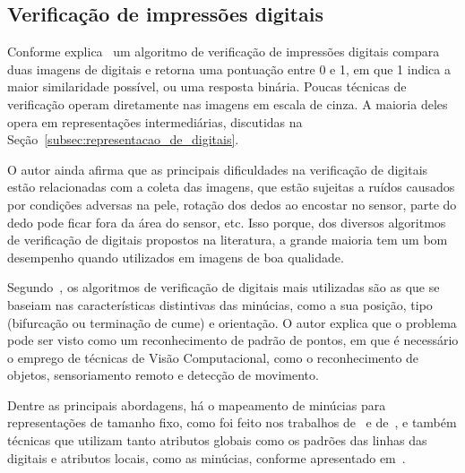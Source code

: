 \subsection{Verificação de impressões digitais}\label{subsubsec:verificacao_digitais}

Conforme explica~ um algoritmo de verificação de impressões digitais compara duas imagens de digitais e retorna uma pontuação entre 0 e 1, em que 1 indica a maior similaridade possível, ou uma resposta binária. Poucas técnicas de verificação operam diretamente nas imagens em escala de cinza. A maioria deles opera em representações intermediárias, discutidas na Seção~\ref{subsec:representacao_de_digitais}.

O autor ainda afirma que as principais dificuldades na verificação de digitais estão relacionadas com a coleta das imagens, que estão sujeitas a ruídos causados por condições adversas na pele, rotação dos dedos ao encostar no sensor, parte do dedo pode ficar fora da área do sensor, etc. Isso porque, dos diversos algoritmos de verificação de digitais propostos na literatura, a grande maioria tem um bom desempenho quando utilizados em imagens de boa qualidade.

Segundo~, os algoritmos de verificação de digitais mais utilizadas são as que se baseiam nas características distintivas das minúcias, como a sua posição, tipo (bifurcação ou terminação de cume) e orientação. O autor explica que o problema pode ser visto como um reconhecimento de padrão de pontos, em que é necessário o emprego de técnicas de Visão Computacional, como o reconhecimento de objetos, sensoriamento remoto e detecção de movimento.

Dentre as principais abordagens, há o mapeamento de minúcias para representações de tamanho fixo, como foi feito nos trabalhos de~ e de~, e também técnicas que utilizam tanto atributos globais como os padrões das linhas das digitais e atributos locais, como as minúcias, conforme apresentado em~\cite{ZHANG2019139}.

